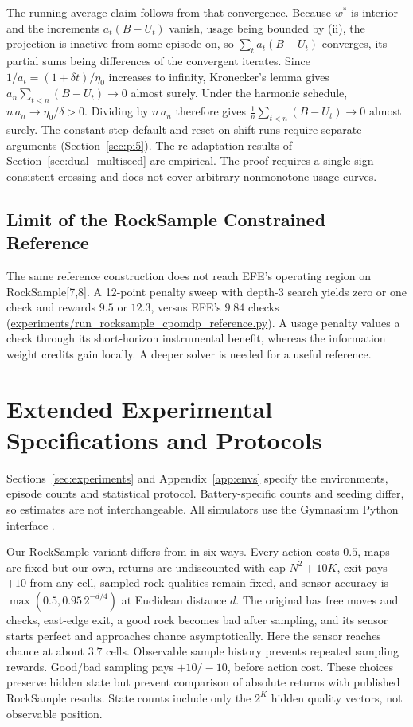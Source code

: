 \documentclass[runningheads]{llncs}
\begin{document}
The running-average claim follows from that convergence. Because $w^*$ is interior and the increments $a_t (B - U_t)$ vanish, usage being bounded by (ii), the projection is inactive from some episode on, so $\sum_t a_t (B - U_t)$ converges, its partial sums being differences of the convergent iterates. Since $1/a_t = (1 + \delta t)/\eta_0$ increases to infinity, Kronecker's lemma gives $a_n \sum_{t<n} (B - U_t) \to 0$ almost surely. Under the harmonic schedule, $n\,a_n \to \eta_0/\delta > 0$. Dividing by $n\,a_n$ therefore gives $\frac{1}{n}\sum_{t<n} (B - U_t) \to 0$ almost surely. The constant-step default and reset-on-shift runs require separate arguments (Section~\ref{sec:pi5}). The re-adaptation results of Section~\ref{sec:dual_multiseed} are empirical. The proof requires a single sign-consistent crossing and does not cover arbitrary nonmonotone usage curves.

\subsection{Limit of the RockSample Constrained Reference}
\label{app:theory_positioning}

The same reference construction does not reach EFE's operating region on RockSample[7,8]. A 12-point penalty sweep with depth-3 search yields zero or one check and rewards $9.5$ or $12.3$, versus EFE's $9.84$ checks (\url{experiments/run_rocksample_cpomdp_reference.py}). A usage penalty values a check through its short-horizon instrumental benefit, whereas the information weight credits gain locally. A deeper solver is needed for a useful reference.

\FloatBarrier
\section{Extended Experimental Specifications and Protocols}
\label{app:experimental_protocol}

Sections~\ref{sec:experiments} and Appendix~\ref{app:envs} specify the environments, episode counts and statistical protocol. Battery-specific counts and seeding differ, so estimates are not interchangeable. All simulators use the Gymnasium Python interface \citep{towers2024}.

Our RockSample variant differs from \citet{smith2004} in six ways. Every action costs $0.5$, maps are fixed but our own, returns are undiscounted with cap $N^2+10K$, exit pays $+10$ from any cell, sampled rock qualities remain fixed, and sensor accuracy is $\max(0.5,0.95\,2^{-d/4})$ at Euclidean distance $d$. The original has free moves and checks, east-edge exit, a good rock becomes bad after sampling, and its sensor starts perfect and approaches chance asymptotically. Here the sensor reaches chance at about $3.7$ cells. Observable sample history prevents repeated sampling rewards. Good/bad sampling pays $+10/-10$, before action cost. These choices preserve hidden state but prevent comparison of absolute returns with published RockSample results. State counts include only the $2^K$ hidden quality vectors, not observable position.
\end{document}
